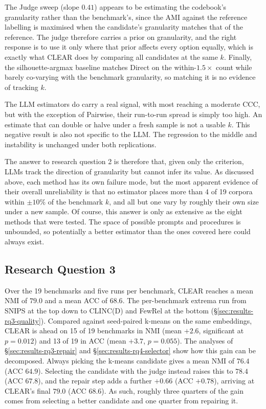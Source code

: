\documentclass[11pt,a4paper,oneside]{report}
\begin{document}
The Judge sweep (slope $0.41$) appears to be estimating the codebook's
granularity rather than the benchmark's, since the AMI against the
reference labelling is maximised when the candidate's granularity matches
that of the reference. The judge therefore carries a prior on granularity, and the right
response is to use it only where that prior affects every option equally,
which is exactly what CLEAR does by comparing all candidates at the
same $k$. Finally, the silhouette-argmax baseline matches Direct on the within-$1.5\times$ count while barely co-varying with the benchmark granularity, so matching it is no evidence of tracking $k$.

The LLM estimators do carry a real signal, with most reaching a moderate CCC, but with the exception of Pairwise, their run-to-run spread is simply too high. An estimate that can double or halve
under a fresh sample is not a usable $k$. This negative result is also
not specific to the LLM. The regression to the middle and instability
is unchanged under both replications.

The answer to research question 2 is therefore that, given only the
criterion, LLMs track the direction of granularity but cannot infer its
value. As discussed above, each method has its own failure mode, but the most apparent evidence of their overall unreliability is that no estimator places more than 4 of 19 corpora within $\pm 10\%$ of the benchmark $k$, and all but one vary by roughly their own size under a new sample. Of course, this answer is only as extensive as the eight methods that were tested. The space of possible prompts and procedures is unbounded, so potentially a better estimator than the ones covered here could always exist.


\subsection{Research Question 3}

Over the 19 benchmarks and five runs per benchmark, CLEAR reaches a mean NMI of $79.0$ and a mean ACC of $68.6$. The per-benchmark extrema run from SNIPS at the top down to CLINC(D) and FewRel at the bottom (\S\ref{sec:results-rq3-quality}). Compared against seed-paired k-means on the same embeddings, CLEAR is
ahead on 15 of 19 benchmarks in NMI (mean $+2.6$, significant at $p = 0.012$) and 13 of 19 in ACC
(mean $+3.7$, $p = 0.055$). The analyses of \S\ref{sec:results-rq3-repair} and
\S\ref{sec:results-rq4-selector} show how this gain can be decomposed. Always picking the k-means candidate gives a mean NMI of $76.4$ (ACC
$64.9$). Selecting the candidate with the judge instead raises this to
$78.4$ (ACC $67.8$), and the repair step adds a further $+0.66$ (ACC
$+0.78$), arriving at CLEAR's final $79.0$ (ACC $68.6$). As such, roughly three quarters of the gain comes from selecting a better candidate and one
quarter from repairing it.
\end{document}
